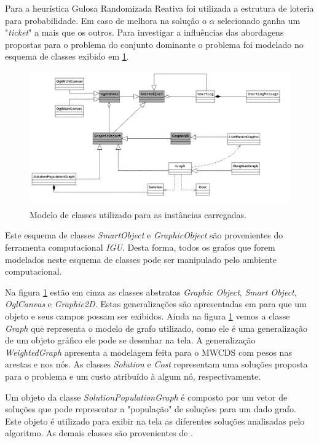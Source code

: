\documentclass[conference,compsoc]{IEEEtran}
\begin{document}
Para a heurística Gulosa Randomizada Reativa foi utilizada a estrutura de loteria para probabilidade. Em caso de melhora na solução o $\alpha$ selecionado ganha um "\textit{ticket}" a mais que os outros. Para investigar a influências das abordagens propostas para o problema do conjunto dominante o problema foi modelado no esquema de classes exibido em \ref{01_model_graph}.

\begin{figure}[!htbp]
    \centering
    \includegraphics[scale=0.2]{ClassDiagram1_.jpg}
    \caption{Modelo de classes utilizado para as instâncias carregadas.}
    \label{01_model_graph}
\end{figure}

Este esquema de classes \textit{SmartObject} e \textit{GraphicObject} são provenientes do ferramenta computacional \textit{IGU}. Desta forma, todos os grafos que forem modelados neste esquema de classes pode ser manipulado pelo ambiente computacional. 

Na figura \ref{01_model_graph} estão em cinza as classes abstratas \textit{Graphic Object}, \textit{Smart Object}, \textit{OglCanvas} e \textit{Graphic2D}. Estas generalizações são apresentadas em \cite{Santos} para que um objeto e seus campos possam ser exibidos. Ainda na figura \ref{01_model_graph} vemos a classe \textit{Graph} que representa o modelo de grafo utilizado, como ele é uma generalização de um objeto gráfico ele pode se desenhar na tela. A generalização \textit{WeightedGraph} apresenta a modelagem feita para o MWCDS com pesos nas arestas e nos nós. As classes \textit{Solution} e \textit{Cost} representam uma soluções proposta para o problema e um custo atribuído à algum nó, respectivamente.

Um objeto da classe \textit{SolutionPopulationGraph} é composto por um vetor de soluções que pode representar a "população" de soluções para um dado grafo. Este objeto é utilizado para exibir na tela as diferentes soluções analisadas pelo algoritmo. As demais classes são provenientes de \cite{Santos}.
\end{document}
